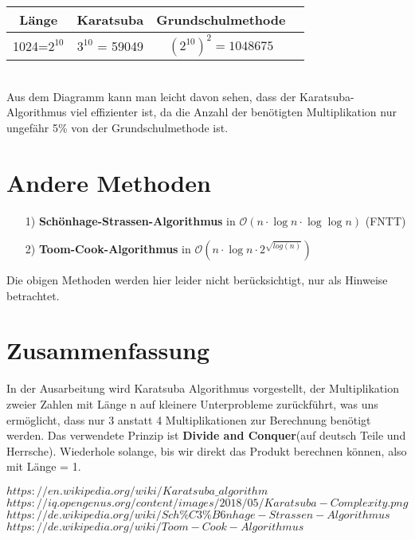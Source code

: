 \documentclass[11pt,a4paper, twoside]{article}
\newtheorem{lemma}[theorem]{Lemma}
\theoremstyle{definition}
\begin{document}
\setlength{\tabcolsep}{7mm}
\begin{tabular}{|c|c|c|p{10cm}<{\centering}}
	\hline
	Länge & Karatsuba & Grundschulmethode\\
	\hline
	1024=$2^{10}$ & $3^{10}$ = 59049 & $(2^{10})^{2} = 1048675$\\
	\hline
\end{tabular}\\ 
Aus dem Diagramm kann man leicht davon sehen, dass der Karatsuba-Algorithmus viel effizienter ist, da die Anzahl der benötigten Multiplikation nur ungefähr 5\% von der Grundschulmethode ist.





\section{Andere Methoden}
\begin{itemize}
	\item[1)]
	\textbf{Schönhage-Strassen-Algorithmus} in $\mathcal{O}(n \cdot \log{n} \cdot \log{\log{n}})$ (FNTT)\cite{3}
	\item[2)]
	\textbf{Toom-Cook-Algorithmus} in $\mathcal{O}(n \cdot \log{n} \cdot 2^{\sqrt{log{(n)}}})$\cite{4} 
\end{itemize}
Die obigen Methoden werden  hier leider nicht berücksichtigt, nur als Hinweise betrachtet.


\section{Zusammenfassung}
In der Ausarbeitung wird Karatsuba Algorithmus vorgestellt, der Multiplikation zweier Zahlen mit Länge n auf kleinere Unterprobleme zurückführt, was uns ermöglicht, dass nur 3 anstatt 4 Multiplikationen zur Berechnung benötigt werden. Das verwendete Prinzip ist \textbf{Divide and Conquer}(auf deutsch Teile und Herrsche).  Wiederhole solange, bis wir direkt das Produkt berechnen können, also mit Länge = 1. 

\begin{thebibliography}{3}
 $https://en.wikipedia.org/wiki/Karatsuba\_algorithm$
 $https://iq.opengenus.org/content/images/2018/05/Karatsuba-Complexity.png$
 $https://de.wikipedia.org/wiki/Sch\%C3\%B6nhage-Strassen-Algorithmus$
 $https://de.wikipedia.org/wiki/Toom-Cook-Algorithmus$
\end{thebibliography}
\FloatBarrier
\printbibliography
\end{document}
